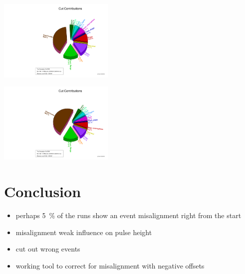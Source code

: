\documentclass[9pt]{beamer}
\begin{document}
\begin{frame}
	\begin{minipage}{5.5cm}
		\centering
		\includegraphics[angle=270, width=5.5cm]{CutContributions396}
	\end{minipage}
	\hspace*{2pt}
	\begin{minipage}{5.5cm}
		\centering
		\includegraphics[angle=270, width=5.5cm]{CutContributions396a}
	\end{minipage}\s
\end{frame}
\section{Conclusion}
\begin{frame}
	\begin{minipage}[c][.5\textheight]{\textwidth}
		\begin{itemize}
			\setlength{\itemsep}{\fill}
			\item perhaps \SI{5}{\%} of the runs show an event misalignment right from the start
			\item misalignment weak influence on pulse height
			\item cut out wrong events
			\item working tool to correct for misalignment with negative offsets
		\end{itemize}
	\end{minipage}
\end{frame}
\end{document}
